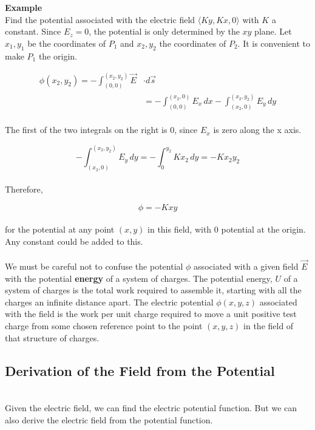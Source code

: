 \documentclass[svgnames]{article}
\begin{document}
\textbf{Example} \\
Find the potential associated with the electric field $\langle Ky, Kx,
0 \rangle$ with $K$ a constant. Since $E_z = 0$, the potential is only
determined by the $xy$ plane. Let $x_1, y_1$ be the coordinates of $P_1$ and
$x_2, y_2$ the coordinates of $P_2$. It is convenient to make $P_1$ the origin.

\begin{align*} 
\phi(x_2, y_2) = -\int_{(0,0)}^{(x_2,y_2)} \vec{E} &\cdot d\vec{s} \\ 
& = - \int_{(0,0)}^{(x_2, 0)} E_x \, dx - \int_{(x_2, 0)}^{(x_2, y_2)} E_y \, dy 
\end{align*} \\

The first of the two integrals on the right is 0, since $E_x$ is zero along the x axis. 

\[ -\int_{(x_2, 0)}^{(x_2, y_2)} E_y \, dy = -\int_0^{y_2} Kx_2\,dy = -Kx_2y_2 \] \\

Therefore, 

\[ \phi = -Kxy \] \\

for the potential at any point $(x,y)$ in this field, with 0 potential at the
origin. Any constant could be added to this. \\ \\

We must be careful not to confuse the potential $\phi$ associated with a given
field $\vec{E}$ with the potential \textbf{energy} of a system of charges. The
potential energy, $U$ of a system of charges is the total work required to
assemble it, starting with all the charges an infinite distance apart. The
electric potential $\phi(x, y, z)$ associated with the field is the work per
unit charge required to move a unit positive test charge from some chosen
reference point to the point $(x, y, z)$ in the field of that structure of
charges. \\

\subsection{Derivation of the Field from the Potential}  \mbox{} \\ 

Given the electric field, we can find the electric potential function. But we
can also derive the electric field from the potential function. \\
\end{document}
